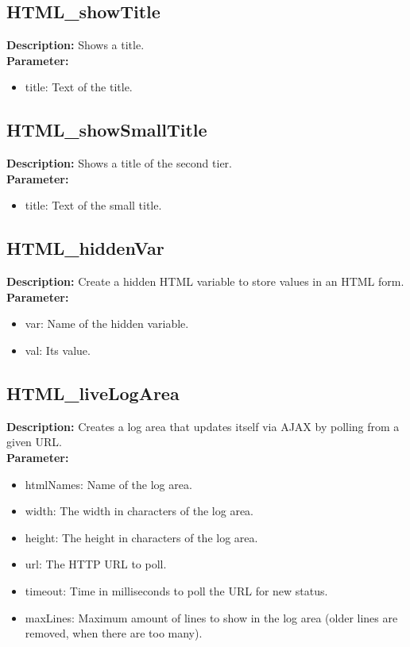 \subsection{HTML\_showTitle}
\textbf{Description:} Shows a title.\\
\textbf{Parameter:}
\begin{itemize}
\item title: Text of the title.
\end{itemize}

\subsection{HTML\_showSmallTitle}
\textbf{Description:} Shows a title of the second tier.\\
\textbf{Parameter:}
\begin{itemize}
\item title: Text of the small title.
\end{itemize}

\subsection{HTML\_hiddenVar}
\textbf{Description:} Create a hidden HTML variable to store values in an HTML form.\\
\textbf{Parameter:}
\begin{itemize}
\item var: Name of the hidden variable.
\item val: Its value.
\end{itemize}

\subsection{HTML\_liveLogArea}
\textbf{Description:} Creates a log area that updates itself via AJAX by polling from a given URL.\\
\textbf{Parameter:}
\begin{itemize}
\item htmlNames: Name of the log area.
\item width: The width in characters of the log area.
\item height: The height in characters of the log area.
\item url: The HTTP URL to poll.
\item timeout: Time in milliseconds to poll the URL for new status.
\item maxLines: Maximum amount of lines to show in the log area (older lines are removed, when there are too many).
\end{itemize}

